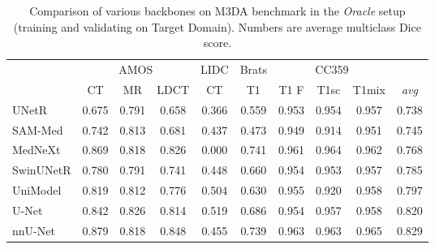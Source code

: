 

\begin{table}[h!]
	\centering
	\caption{Comparison of various backbones on M3DA benchmark in the \textit{Oracle} setup (training and validating on Target Domain). Numbers are average multiclass Dice score.}  %
	
		\begin{tabular}{lccccccccc}
			\toprule
			& \multicolumn{3}{c}{AMOS} & LIDC & Brats & \multicolumn{3}{c}{CC359} & \\
			
			\cmidrule(lr){2-4} \cmidrule(lr){5-5} \cmidrule(lr){6-6} \cmidrule(lr){7-9}
			
			& CT & MR & LDCT & CT & T1 & T1 F & T1sc & T1mix & \textit{avg} \\
			
			\midrule
			
			UNetR & 0.675 & 0.791 & 0.658 & 0.366 & 0.559 & 0.953 & 0.954 & 0.957 & 0.738 \\
			SAM-Med & 0.742 & 0.813 & 0.681 & 0.437 & 0.473 & 0.949 & 0.914 & 0.951 & 0.745 \\
			
			MedNeXt & 0.869 & 0.818 & 0.826 & 0.000 & 0.741 & 0.961 & 0.964 & 0.962 & 0.768 \\
			
			SwinUNetR & 0.780 & 0.791 & 0.741 & 0.448 & 0.660 & 0.954 & 0.953 & 0.957 & 0.785 \\
			
			UniModel & 0.819 & 0.812 & 0.776 & 0.504 & 0.630 & 0.955 & 0.920 & 0.958 & 0.797 \\
			
			U-Net & 0.842 & 0.826 & 0.814 & 0.519 & 0.686 & 0.954 & 0.957 & 0.958 & 0.820 \\
			
			nnU-Net & 0.879 & 0.818 & 0.848 & 0.455 & 0.739 & 0.963 & 0.963 & 0.965 & 0.829 \\
			
			\bottomrule
				
	\end{tabular}%
	\label{tab:backbones}
\end{table}

